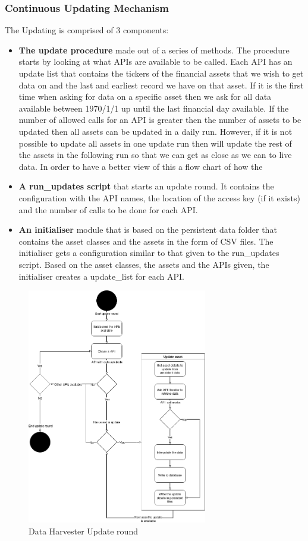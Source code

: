 \documentclass[main.tex]{subfiles}
\begin{document}
\subsubsection{Continuous Updating Mechanism}
The Updating is comprised of 3 components:
\begin{itemize}
    \item \textbf{The update procedure} made out of a series of methods. The procedure starts by looking at what APIs are available to be called. Each API has an update list that contains the tickers of the financial assets that we wish to get data on and the last and earliest record we have on that asset. If it is the first time when asking for data on a specific asset then we ask for all data available between 1970/1/1 up until the last financial day available. If the number of allowed calls for an API is greater then the number of assets to be updated then all assets can be updated in a daily run. However, if it is not possible to update all assets in one update run then will update the rest of the assets in the following run so that we can get as close as we can to live data. In order to have a better view of this a flow chart of how the 
    \item \textbf{A run\_updates script} that starts an update round. It contains the configuration with the API names, the location of the access key (if it exists) and the number of calls to be done for each API. 
    \item \textbf{An initialiser} module that is based on the persistent data folder that contains the asset classes and the assets in the form of CSV files. The initialiser gets a configuration similar to that given to the run\_updates script. Based on the asset classes, the assets and the APIs given, the initialiser creates a update\_list for each API.
\end{itemize}

\begin{figure}[H]
    \centering
    \caption{Data Harvester Update round\cite{TR}}
    \includegraphics[width=0.7\textwidth]{04Design/04Pictures/update_mechanism_flow_chart.png}
\end{figure}
\end{document}
